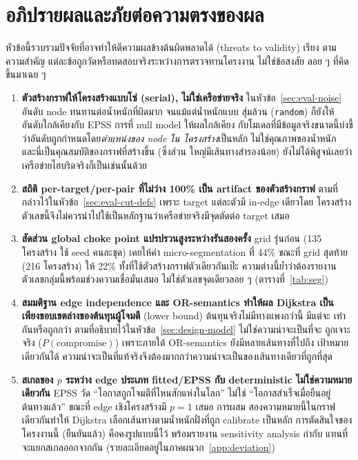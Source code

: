 \section{อภิปรายผลและภัยต่อความตรงของผล}\label{sec:eval-threats}

หัวข้อนี้รวบรวมปัจจัยที่อาจทำให้ตีความผลข้างต้นผิดพลาดได้ (threats to validity) เรียง
ตามความสำคัญ แต่ละข้อถูกวัดหรือทดสอบจริงระหว่างการตรวจทานโครงงาน ไม่ใช่ข้อสงสัย
ลอย ๆ ที่คิดขึ้นมาเฉย ๆ

\begin{enumerate}[leftmargin=1.6em]

\item \textbf{ตัวสร้างกราฟให้โครงสร้างแบบโซ่ (serial), ไม่ใช่เครือข่ายจริง}
ในหัวข้อ~\ref{sec:eval-noise} อันดับ node ทนทานต่อน้ำหนักที่ผิดมาก จนแม้แต่น้ำหนักแบบ
สุ่มล้วน (\texttt{random}) ก็ยังให้อันดับใกล้เคียงกับ EPSS การที่ null model ให้ผลใกล้เคียง
กับโมเดลที่มีข้อมูลจริงขนาดนี้บ่งชี้ว่าอันดับถูกกำหนดโดย\emph{ตำแหน่งของ node ใน
โครงสร้าง}เป็นหลัก ไม่ใช่คุณภาพของน้ำหนัก และนี่เป็นคุณสมบัติของกราฟที่สร้างขึ้น (ซึ่งส่วน
ใหญ่มีเส้นทางสำรองน้อย) ยังไม่ได้พิสูจน์เลยว่าเครือข่ายไฮบริดจริงก็เป็นเช่นนั้นด้วย

\item \textbf{สถิติ per-target/per-pair ที่ไม่ว่าง 100\% เป็น artifact ของตัวสร้างกราฟ}
ตามที่กล่าวไว้ในหัวข้อ~\ref{sec:eval-cut-defs} เพราะ target แต่ละตัวมี in-edge เดียวโดย
โครงสร้าง ตัวเลขนี้จึงไม่ควรนำไปใช้เป็นหลักฐานว่าเครือข่ายจริงมีจุดตัดต่อ target เสมอ

\item \textbf{สัดส่วน global choke point แปรปรวนสูงระหว่างรันสองครั้ง} grid รุ่นก่อน (135
โครงสร้าง ใช้ seed คนละชุด) เคยให้ค่า micro-segmentation ที่ 44\% ขณะที่ grid สุดท้าย
(216 โครงสร้าง) ให้ 22\% ทั้งที่ใช้ตัวสร้างกราฟตัวเดียวกันเป๊ะ ความต่างนี้ย้ำว่าต้องรายงาน
ตัวเลขกลุ่มนี้พร้อมช่วงความเชื่อมั่นเสมอ ไม่ใช่ตัวเลขจุดเดียวลอย ๆ (ตารางที่~\ref{tab:seg})

\item \textbf{สมมติฐาน edge independence และ OR-semantics ทำให้ผล Dijkstra เป็น
เพียงขอบเขตล่างของต้นทุนผู้โจมตี} (lower bound) ต้นทุนจริงไม่มีทางแพงกว่านี้ มีแต่จะ
เท่ากันหรือถูกกว่า ตามที่อธิบายไว้ในหัวข้อ~\ref{sec:design-model} ไม่ใช่ความน่าจะเป็นที่จะ
ถูกเจาะจริง ($P(\text{compromise})$) เพราะภายใต้ OR-semantics ยังมีหลายเส้นทางที่ไปถึง
เป้าหมายเดียวกันได้ ความน่าจะเป็นที่แท้จริงจึงต้องมากกว่าความน่าจะเป็นของเส้นทางเดียวที่ถูกที่สุด

\item\label{item:threat-pscale} \textbf{สเกลของ $p$ ระหว่าง edge ประเภท fitted/EPSS
กับ deterministic ไม่ใช่ความหมายเดียวกัน} EPSS วัด ``โอกาสถูกโจมตีที่ไหนสักแห่งในโลก''
ไม่ใช่ ``โอกาสสำเร็จเมื่อยืนอยู่ต้นทางแล้ว'' ขณะที่ edge เชิงโครงสร้างมี $p=1$ เสมอ การผสม
สองความหมายนี้ในกราฟเดียวกันทำให้ Dijkstra เลือกเส้นทางตามน้ำหนักฝั่งที่ถูก calibrate
เป็นหลัก การตัดสินใจของโครงงานนี้ (ยืนยันแล้ว) คือคงรูปแบบนี้ไว้ พร้อมรายงาน sensitivity
analysis กำกับ แทนที่จะแยกสเกลออกจากกัน (รายละเอียดอยู่ในภาคผนวก~\ref{app:deviation})


\end{enumerate}
